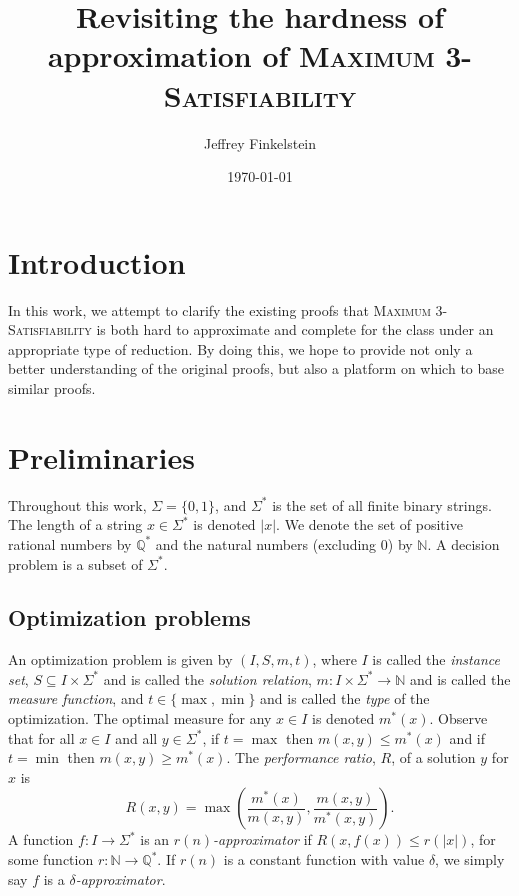 \documentclass[]{article}
\author{Jef{}frey Finkelstein}
\date{\today}
\title{Revisiting the hardness of approximation of \texorpdfstring{\textsc{Maximum 3-Satisfiability}}{Maximum 3-Satisfiability}}
\theoremstyle{plain}
\theoremstyle{definition}
\begin{document}
\maketitle

\section{Introduction}

In this work, we attempt to clarify the existing proofs that \textsc{Maximum 3-Satisfiability} is both hard to approximate and complete for the class \APX{} under an appropriate type of reduction.
By doing this, we hope to provide not only a better understanding of the original proofs, but also a platform on which to base similar proofs.

\section{Preliminaries}

Throughout this work, $\Sigma=\{0, 1\}$, and $\Sigma^*$ is the set of all finite binary strings.
The length of a string $x \in \Sigma^*$ is denoted $|x|$.
We denote the set of positive rational numbers by $\mathbb{Q}^*$ and the natural numbers (excluding 0) by $\mathbb{N}$.
A decision problem is a subset of $\Sigma^*$.

\subsection{Optimization problems}

An optimization problem is given by $(I, S, m, t)$, where $I$ is called the \emph{instance set}, $S \subseteq I \times \Sigma^*$ and is called the \emph{solution relation}, $m \colon I \times \Sigma^* \to \mathbb{N}$ and is called the \emph{measure function}, and $t\in\{\max, \min\}$ and is called the \emph{type} of the optimization.
The optimal measure for any $x \in I$ is denoted $m^*(x)$.
Observe that for all $x \in I$ and all $y \in \Sigma^*$, if $t = \max$ then $m(x, y) \leq m^*(x)$ and if $t = \min$ then $m(x, y) \geq m^*(x)$.
The \emph{performance ratio}, $R$, of a solution $y$ for $x$ is
\begin{displaymath}
  R(x, y) = \max{\left(\frac{m^*(x)}{m(x, y)}, \frac{m(x, y)}{m^*(x, y)}\right)}.
\end{displaymath}
A function $f \colon I \to \Sigma^*$ is an \emph{$r(n)$-approximator} if $R(x, f(x)) \leq r(|x|)$, for some function $r \colon \mathbb{N} \to \mathbb{Q}^*$.
If $r(n)$ is a constant function with value $\delta$, we simply say $f$ is a \emph{$\delta$-approximator}.
\end{document}
